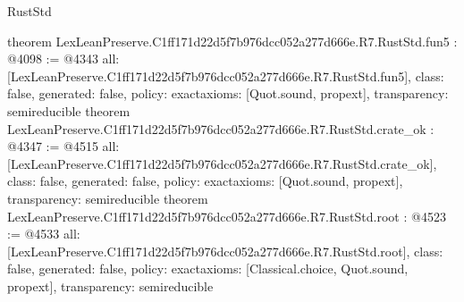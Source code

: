 \begin{lexlean}{RustStd}
\begin{coremodule}
{}
theorem LexLeanPreserve.C1ff171d22d5f7b976dcc052a277d666e.R7.RustStd.fun5 : @4098 := @4343 {
  all: [LexLeanPreserve.C1ff171d22d5f7b976dcc052a277d666e.R7.RustStd.fun5],
  class: false,
  generated: false,
  policy: exact{axioms: [Quot.sound, propext]},
  transparency: semireducible
}
theorem LexLeanPreserve.C1ff171d22d5f7b976dcc052a277d666e.R7.RustStd.crate_ok : @4347 := @4515 {
  all: [LexLeanPreserve.C1ff171d22d5f7b976dcc052a277d666e.R7.RustStd.crate_ok],
  class: false,
  generated: false,
  policy: exact{axioms: [Quot.sound, propext]},
  transparency: semireducible
}
theorem LexLeanPreserve.C1ff171d22d5f7b976dcc052a277d666e.R7.RustStd.root : @4523 := @4533 {
  all: [LexLeanPreserve.C1ff171d22d5f7b976dcc052a277d666e.R7.RustStd.root],
  class: false,
  generated: false,
  policy: exact{axioms: [Classical.choice, Quot.sound, propext]},
  transparency: semireducible
}


\end{coremodule}
\end{lexlean}
